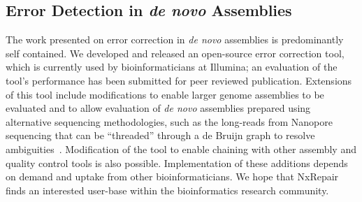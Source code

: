 \subsection{Error Detection in \emph{de novo} Assemblies}
The work presented on error correction in \emph{de novo} assemblies is predominantly self contained. We developed and released an open-source error correction tool, which is currently used by bioinformaticians at Illumina; an evaluation of the tool's performance has been submitted for peer reviewed publication. Extensions of this tool include modifications to enable larger genome assemblies to be evaluated and to allow evaluation of \emph{de novo} assemblies prepared using alternative sequencing methodologies, such as the long-reads from Nanopore sequencing that can be ``threaded'' through a de Bruijn graph to resolve ambiguities~\cite{Koren2015}. Modification of the tool to enable chaining with other assembly and quality control tools is also possible. Implementation of these additions depends on demand and uptake from other bioinformaticians. We hope that NxRepair finds an interested user-base within the bioinformatics research community.
